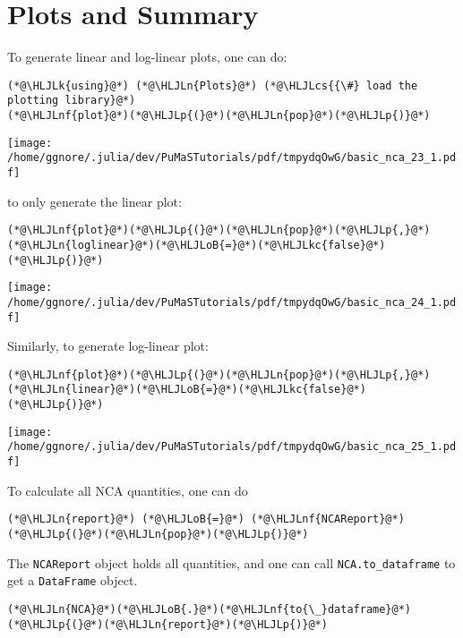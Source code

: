 \documentclass[12pt,a4paper]{article}
\newcommand{\HLJLk}[1]{\textcolor[RGB]{148,91,176}{\textbf{#1}}}
\newcommand{\HLJLkc}[1]{\textcolor[RGB]{59,151,46}{\textit{#1}}}
\newcommand{\HLJLn}[1]{#1}
\newcommand{\HLJLnf}[1]{\textcolor[RGB]{66,102,213}{#1}}
\newcommand{\HLJLoB}[1]{\textcolor[RGB]{102,102,102}{\textbf{#1}}}
\newcommand{\HLJLp}[1]{#1}
\newcommand{\HLJLcs}[1]{\textcolor[RGB]{153,153,119}{\textit{#1}}}
\begin{document}
\section{Plots and Summary}
To generate linear and log-linear plots, one can do:


\begin{lstlisting}
(*@\HLJLk{using}@*) (*@\HLJLn{Plots}@*) (*@\HLJLcs{{\#} load the plotting library}@*)
(*@\HLJLnf{plot}@*)(*@\HLJLp{(}@*)(*@\HLJLn{pop}@*)(*@\HLJLp{)}@*)
\end{lstlisting}

\texttt{[image: /home/ggnore/.julia/dev/PuMaSTutorials/pdf/tmpydqOwG/basic\_nca\_23\_1.pdf]}

to only generate the linear plot:


\begin{lstlisting}
(*@\HLJLnf{plot}@*)(*@\HLJLp{(}@*)(*@\HLJLn{pop}@*)(*@\HLJLp{,}@*) (*@\HLJLn{loglinear}@*)(*@\HLJLoB{=}@*)(*@\HLJLkc{false}@*)(*@\HLJLp{)}@*)
\end{lstlisting}

\texttt{[image: /home/ggnore/.julia/dev/PuMaSTutorials/pdf/tmpydqOwG/basic\_nca\_24\_1.pdf]}

Similarly, to generate log-linear plot:


\begin{lstlisting}
(*@\HLJLnf{plot}@*)(*@\HLJLp{(}@*)(*@\HLJLn{pop}@*)(*@\HLJLp{,}@*) (*@\HLJLn{linear}@*)(*@\HLJLoB{=}@*)(*@\HLJLkc{false}@*)(*@\HLJLp{)}@*)
\end{lstlisting}

\texttt{[image: /home/ggnore/.julia/dev/PuMaSTutorials/pdf/tmpydqOwG/basic\_nca\_25\_1.pdf]}

To calculate all NCA quantities, one can do


\begin{lstlisting}
(*@\HLJLn{report}@*) (*@\HLJLoB{=}@*) (*@\HLJLnf{NCAReport}@*)(*@\HLJLp{(}@*)(*@\HLJLn{pop}@*)(*@\HLJLp{)}@*)
\end{lstlisting}


The \texttt{NCAReport} object holds all quantities, and one can call \texttt{NCA.to\_dataframe} to get a \texttt{DataFrame} object.


\begin{lstlisting}
(*@\HLJLn{NCA}@*)(*@\HLJLoB{.}@*)(*@\HLJLnf{to{\_}dataframe}@*)(*@\HLJLp{(}@*)(*@\HLJLn{report}@*)(*@\HLJLp{)}@*)
\end{lstlisting}
\end{document}
